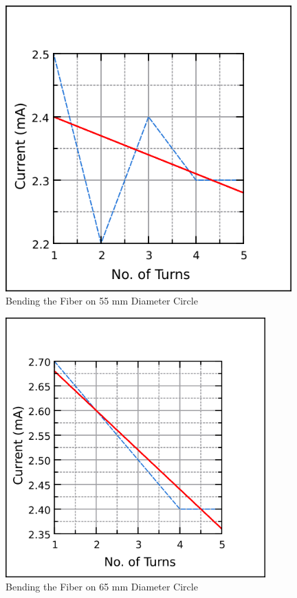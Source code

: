 \begin{figure}
        \centering
        \includegraphics[width = 11cm]{images/BL3.png}
        \caption{Bending the Fiber on 55 mm Diameter Circle}
    \end{figure}
\begin{figure}
        \centering
        \includegraphics[width = 10cm]{images/BL4.png}
        \caption{Bending the Fiber on 65 mm Diameter Circle}
    \end{figure}
